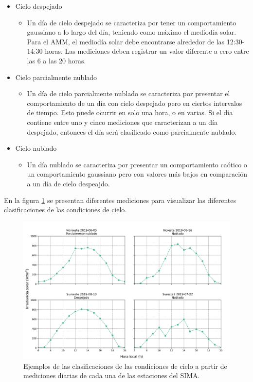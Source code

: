 \begin{itemize}
	\item Cielo despejado
		\begin{itemize}
			\item Un día de cielo despejado se caracteriza por tener un comportamiento gaussiano a lo largo del día, teniendo como máximo el mediodía solar. Para el AMM, el mediodía solar debe encontrarse alrededor de las 12:30-14:30 horas. Las mediciones deben registrar un valor diferente a cero entre las 6 a las 20 horas.
		\end{itemize}
	\item Cielo parcialmente nublado
		\begin{itemize}
			\item Un día de cielo parcialmente nublado se caracteriza por presentar el comportamiento de un día con cielo despejado pero en ciertos intervalos de tiempo. Esto puede ocurrir en solo una hora, o en varias. Si el día contiene entre uno y cinco mediciones que caracterizan a un día despejado, entonces el día será clasificado como parcialmente nublado.
		\end{itemize}
	\item Cielo nublado
		\begin{itemize}
			\item Un día nublado se caracteriza por presentar un comportamiento caótico o un comportamiento gaussiano pero con valores más bajos en comparación a un día de cielo despeajdo.
		\end{itemize}
\end{itemize}

En la figura \ref{fig:example_sky_conditions} se presentan diferentes mediciones para visualizar las diferentes clasificaciones de las condiciones de cielo.

\begin{figure}[H]
	\centering
	\includegraphics[width=15cm]{Graphics/example_sky_conditions.png}
	\caption{Ejemplos de las clasificaciones de las condiciones de cielo a partir de mediciones diarias de cada una de las estaciones del SIMA.}
	\label{fig:example_sky_conditions}
\end{figure}

